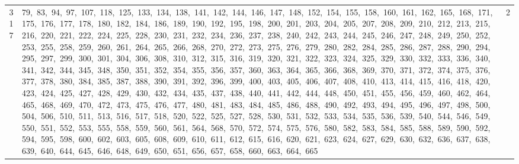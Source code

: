 \begin{longtable}{c|p{}|r}
317 & 79,\ 83,\ 94,\ 97,\ 107,\ 118,\ 125,\ 133,\ 134,\ 138,\ 141,\ 142,\ 144,\ 146,\ 147,\ 148,\ 152,\ 154,\ 155,\ 158,\ 160,\ 161,\ 162,\ 165,\ 168,\ 171,\ 175,\ 176,\ 177,\ 178,\ 180,\ 182,\ 184,\ 186,\ 189,\ 190,\ 192,\ 195,\ 198,\ 200,\ 201,\ 203,\ 204,\ 205,\ 207,\ 208,\ 209,\ 210,\ 212,\ 213,\ 215,\ 216,\ 220,\ 221,\ 222,\ 224,\ 225,\ 228,\ 230,\ 231,\ 232,\ 234,\ 236,\ 237,\ 238,\ 240,\ 242,\ 243,\ 244,\ 245,\ 246,\ 247,\ 248,\ 249,\ 250,\ 252,\ 253,\ 255,\ 258,\ 259,\ 260,\ 261,\ 264,\ 265,\ 266,\ 268,\ 270,\ 272,\ 273,\ 275,\ 276,\ 279,\ 280,\ 282,\ 284,\ 285,\ 286,\ 287,\ 288,\ 290,\ 294,\ 295,\ 297,\ 299,\ 300,\ 301,\ 304,\ 306,\ 308,\ 310,\ 312,\ 315,\ 316,\ 319,\ 320,\ 321,\ 322,\ 323,\ 324,\ 325,\ 329,\ 330,\ 332,\ 333,\ 336,\ 340,\ 341,\ 342,\ 344,\ 345,\ 348,\ 350,\ 351,\ 352,\ 354,\ 355,\ 356,\ 357,\ 360,\ 363,\ 364,\ 365,\ 366,\ 368,\ 369,\ 370,\ 371,\ 372,\ 374,\ 375,\ 376,\ 377,\ 378,\ 380,\ 384,\ 385,\ 387,\ 388,\ 390,\ 391,\ 392,\ 396,\ 399,\ 400,\ 403,\ 405,\ 406,\ 407,\ 408,\ 410,\ 413,\ 414,\ 415,\ 416,\ 418,\ 420,\ 423,\ 424,\ 425,\ 427,\ 428,\ 429,\ 430,\ 432,\ 434,\ 435,\ 437,\ 438,\ 440,\ 441,\ 442,\ 444,\ 448,\ 450,\ 451,\ 455,\ 456,\ 459,\ 460,\ 462,\ 464,\ 465,\ 468,\ 469,\ 470,\ 472,\ 473,\ 475,\ 476,\ 477,\ 480,\ 481,\ 483,\ 484,\ 485,\ 486,\ 488,\ 490,\ 492,\ 493,\ 494,\ 495,\ 496,\ 497,\ 498,\ 500,\ 504,\ 506,\ 510,\ 511,\ 513,\ 516,\ 517,\ 518,\ 520,\ 522,\ 525,\ 527,\ 528,\ 530,\ 531,\ 532,\ 533,\ 534,\ 535,\ 536,\ 539,\ 540,\ 544,\ 546,\ 549,\ 550,\ 551,\ 552,\ 553,\ 555,\ 558,\ 559,\ 560,\ 561,\ 564,\ 568,\ 570,\ 572,\ 574,\ 575,\ 576,\ 580,\ 582,\ 583,\ 584,\ 585,\ 588,\ 589,\ 590,\ 592,\ 594,\ 595,\ 598,\ 600,\ 602,\ 603,\ 605,\ 608,\ 609,\ 610,\ 611,\ 612,\ 615,\ 616,\ 620,\ 621,\ 623,\ 624,\ 627,\ 629,\ 630,\ 632,\ 636,\ 637,\ 638,\ 639,\ 640,\ 644,\ 645,\ 646,\ 648,\ 649,\ 650,\ 651,\ 656,\ 657,\ 658,\ 660,\ 663,\ 664,\ 665 & 2 \\

\end{longtable}
